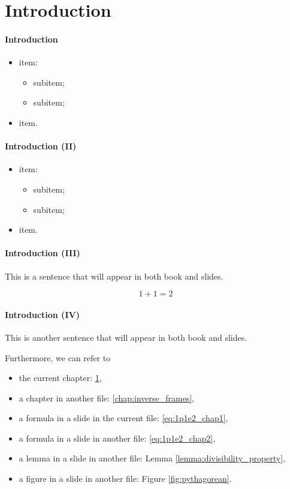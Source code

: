\setcounter{chapter}{0}
\chapter{Introduction}
\label{chap:intro}

\begin{frame}
\frametitle{Introduction}
\begin{itemize}
\item {} item:
\begin{itemize}
\item {} subitem;
\item {} subitem;
\end{itemize}
\item {}  item.
\end{itemize}
\end{frame}

\begin{frame}
\frametitle{Introduction (II)}
\begin{itemize}
\item {} item:
\begin{itemize}
\item {} subitem;
\item {} subitem;
\end{itemize}
\item {}  item.
\end{itemize}
\end{frame}

\begin{frame}
\frametitle{Introduction (III)}
This is a sentence that will appear in both book and slides.

\begin{equation}
1 + 1 = 2
\label{eq:1p1e2_chap1}
\end{equation}
\end{frame}

\begin{frame}
\frametitle{Introduction (IV)}
This is another sentence that will appear in both book and slides.

Furthermore, we can refer to
\begin{itemize}
\item the current chapter: \ref{chap:intro},
\item a chapter in another file: \ref{chap:inverse_frames},
\item a formula in a slide in the current file: \eqref{eq:1p1e2_chap1},
\item a formula in a slide in another file: \eqref{eq:1p1e2_chap2},
\item a lemma in a slide in another file: Lemma \ref{lemma:divisibility_property},
\item a figure in a slide in another file: Figure \ref{fig:pythagorean}.
\end{itemize}
\end{frame}



